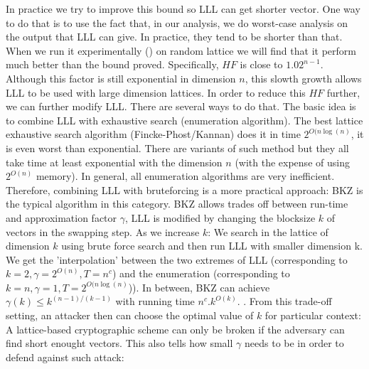 \begin{description}
            In practice we try to improve this bound so LLL can get shorter
            vector. One way to do that is to use the fact that, in our analysis,
            we do worst-case analysis on the output that LLL can give. In
            practice, they tend to be shorter than that. When we run it
            experimentally (\cite{nguyen2006lll}) on random lattice we will find that it perform much
            better than the bound proved. Specifically, $HF$ is close to
            $1.02^{n-1}$. Although this factor is still exponential in dimension
            $n$, this slowth growth allows LLL to be used with large dimension
            lattices.
            In order to reduce this $HF$ further, we can further modify LLL.
            There are several ways to do that. The basic idea is to combine LLL
            with exhaustive search (enumeration algorithm). The best lattice
            exhaustive search algorithm (Fincke-Phost/Kannan) does it in time
            $2^{O(n\log(n)}$, it is even worst than exponential. There are
            variants of such method but they all take time at least
            exponential with the dimension $n$ (with the expense of using
            $2^{O(n)}$ memory). In general, all enumeration algorithms are very
            inefficient. Therefore, combining LLL with bruteforcing is a more
            practical approach: BKZ is the typical algorithm in this category.
            BKZ allows trades off between
            run-time and approximation factor $\gamma$, LLL is modified by
            changing the blocksize $k$ of vectors in the swapping step. As we
            increase $k$: We search in the lattice of dimension $k$ using brute
            force search and then run LLL with smaller dimension k. We get the
            'interpolation' between the two extremes of LLL (corresponding to
            $k = 2, \gamma = 2^{O(n)}, T = n^c$) and the enumeration (corresponding
            to $k = n, \gamma=1, T = 2^{O(n\log(n)}$)). In between, BKZ can
            achieve $\gamma(k) \leq k^{(n-1)/(k-1)}$ with running time
            $n^c.k^{O(k)}$. \cite{hanrot2011terminating}. From this trade-off setting, an
            attacker then
            can choose the optimal value of $k$ for particular context: A
            lattice-based
            cryptographic scheme can only be broken if the adversary can find
            short enought vectors. This also tells how small $\gamma$ needs to
            be in order to defend against such attack:


\end{description}
